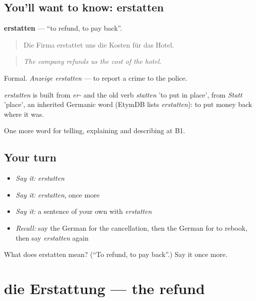 \subsection*{You'll want to know: erstatten}
\textbf{erstatten} — \textquotedblleft{}to refund, to pay back\textquotedblright{}.

\begin{quote}
Die Firma erstattet uns die Kosten für das Hotel.
\end{quote}

\begin{quote}
\emph{The company refunds us the cost of the hotel.}
\end{quote}

Formal. \emph{Anzeige erstatten} — to report a crime to the police.

\begin{cousinweb}
\emph{erstatten} is built from \emph{er-} and the old verb \emph{statten} 'to put in place', from \emph{Statt} 'place', an inherited Germanic word (EtymDB lists \emph{erstatten}): to put money back where it was.
\end{cousinweb}

\begin{grammarlens}[title={What you've built}]
One more word for telling, explaining and describing at B1.
\end{grammarlens}

\subsection*{Your turn}
\begin{itemize}
\raggedright
  \item \emph{Say it:} \emph{erstatten}
  \item \emph{Say it:} \emph{erstatten}, once more
  \item \emph{Say it:} a sentence of your own with \emph{erstatten}
  \item \emph{Recall:} say the German for the cancellation, then the German for to rebook, then say \emph{erstatten} again
\end{itemize}

\begin{tcolorbox}[breakable,colback=teal!4,colframe=teal!35!black,title={Before you move on}]
What does erstatten mean? (\textquotedblleft{}To refund, to pay back\textquotedblright{}.) Say it once more.
\end{tcolorbox}
\section[die Erstattung]{die Erstattung — the refund}

